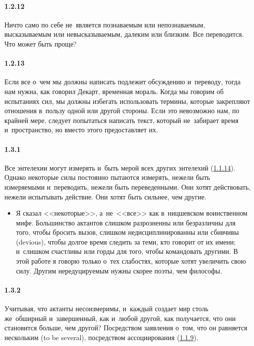 \paragraph{1.2.12}\hypertarget{par:1.2.12}{} Ничто само по себе не~является познаваемым или непознаваемым, высказываемым или невысказываемым, далеким или близким. Все переводится. Что может быть проще?

\paragraph{1.2.13}\hypertarget{par:1.2.13}{} Если все о~чем мы должны написать подлежит обсуждению и~переводу, тогда нам нужна, как говорил Декарт, временная мораль. Когда мы говорим об испытаниях сил, мы должны избегать использовать термины, которые закрепляют отношения в~пользу одной или другой стороны. Если это невозможно нам, по крайней мере, следует попытаться написать текст, который не~забирает время и~пространство, но вместо этого предоставляет их.

\paragraph{1.3.1}\hypertarget{par:1.3.1}{} Все энтелехии могут измерять и~быть мерой всех других энтелехий (\hyperlink{par:1.1.14}{1.1.14}). Однако некоторые силы постоянно пытаются измерять, нежели быть измеряемыми и~переводить, нежели быть переведенными. Они хотят действовать, нежели испытывать действие. Они хотят быть сильнее, чем другие.
	\begin{itemize}
	\item Я сказал <<некоторые>>, а~не~<<все>> как в~ницшевском воинственном мифе. Большинство актантов слишком разрозненны или безразличны для того, чтобы бросить вызов, слишком недисциплинированны или сбивчивы (devious), чтобы долгое время следить за теми, кто говорит от их имени; и~слишком счастливы или горды для того, чтобы командовать другими. В этой работе я говорю только о~тех слабостях, которые хотят увеличить свою силу. Другим нередуцируемым нужны скорее поэты, чем философы.
	\end{itemize}

\paragraph{1.3.2}\hypertarget{par:1.3.2}{} Учитывая, что актанты несоизмеримы, и~каждый создает мир столь же~обширный и~завершенный, как и~любой другой, как получается, что они становится больше, чем другой? Посредством заявления о~том, что он равняется нескольким (to be several), посредством ассоциирования (\hyperlink{par:1.1.9}{1.1.9}).

